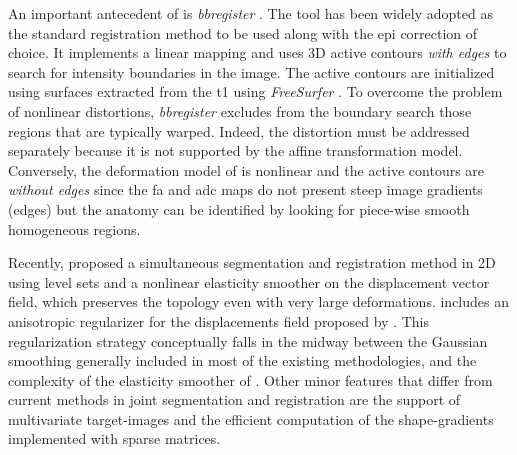 An important antecedent of \regseg{} is \emph{bbregister} \citep{greve_accurate_2009}.
The tool has been widely adopted as the standard registration method to be used along with the \gls*{epi}
  correction of choice.
It implements a linear mapping and uses 3D active contours \emph{with edges} to
  search for intensity boundaries in the \lowb{} image.
The active contours are initialized using surfaces extracted from the \gls*{t1} using
  \emph{FreeSurfer} \citep{fischl_freesurfer_2012}.
To overcome the problem of nonlinear distortions, \emph{bbregister} excludes from the
  boundary search those regions that are typically warped.
Indeed, the distortion must be addressed separately because it is not supported by
  the affine transformation model.
Conversely, the deformation model of \regseg{} is nonlinear and the active contours are
  \emph{without edges} \citep{chan_active_2001} since the \gls*{fa} and \gls*{adc} maps
  do not present steep image gradients (edges) but the anatomy can be identified
  by looking for piece-wise smooth homogeneous regions.

Recently, \cite{guyader_combined_2011} proposed a simultaneous segmentation and
  registration method in 2D using level sets and a nonlinear elasticity smoother on the
  displacement vector field, which preserves the topology even with very large deformations.
\Regseg{} includes an anisotropic regularizer for the displacements field proposed by
  \cite{nagel_investigation_1986}.
This regularization strategy conceptually falls in the midway between the Gaussian smoothing
  generally included in most of the existing methodologies, and the complexity of
  the elasticity smoother of \cite{guyader_combined_2011}.
Other minor features that differ from current methods in joint segmentation and registration are
  the support of multivariate target-images and the efficient computation of the shape-gradients
  implemented with sparse matrices.

